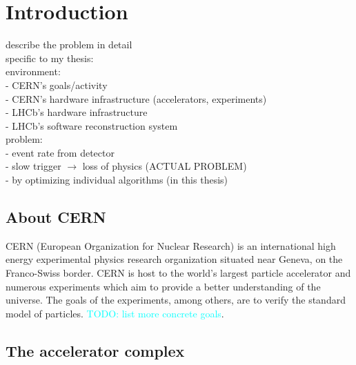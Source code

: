\documentclass[12pt]{article}
\begin{document}
	
	\newpage
	\section{Introduction}
	
	\color{red}
	describe the problem in detail \\
	specific to my thesis: \\
	environment: \\
	- CERN's goals/activity \\
	- CERN's hardware infrastructure (accelerators, experiments) \\
	- LHCb's hardware infrastructure \\
	- LHCb's software reconstruction system \\
	problem: \\
	- event rate from detector \\
	- slow trigger $\rightarrow$ loss of physics (ACTUAL PROBLEM) \\
	- by optimizing individual algorithms (in this thesis) \\
	\color{black}
	\vspace{1.5pc}
	
	\subsection{About CERN}
	
	CERN (European Organization for Nuclear Research) is an international high energy experimental physics research organization situated near Geneva, on the Franco-Swiss border. CERN is host to the world's largest particle accelerator and numerous experiments which aim to provide a better understanding of the universe. The goals of the experiments, among others, are to verify the standard model of particles. \textcolor{cyan}{TODO: list more concrete goals}.
	\cite{cern_about}
	
	
	\subsection{The accelerator complex \cite{cern_accel_complex}}
	
\end{document}

